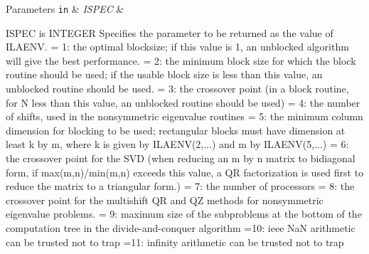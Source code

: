 \begin{DoxyParams}[1]{Parameters}
\mbox{\tt in}  & {\em I\+S\+P\+E\+C} & \begin{DoxyVerb}          ISPEC is INTEGER
          Specifies the parameter to be returned as the value of
          ILAENV.
          = 1: the optimal blocksize; if this value is 1, an unblocked
               algorithm will give the best performance.
          = 2: the minimum block size for which the block routine
               should be used; if the usable block size is less than
               this value, an unblocked routine should be used.
          = 3: the crossover point (in a block routine, for N less
               than this value, an unblocked routine should be used)
          = 4: the number of shifts, used in the nonsymmetric
               eigenvalue routines
          = 5: the minimum column dimension for blocking to be used;
               rectangular blocks must have dimension at least k by m,
               where k is given by ILAENV(2,...) and m by ILAENV(5,...)
          = 6: the crossover point for the SVD (when reducing an m by n
               matrix to bidiagonal form, if max(m,n)/min(m,n) exceeds
               this value, a QR factorization is used first to reduce
               the matrix to a triangular form.)
          = 7: the number of processors
          = 8: the crossover point for the multishift QR and QZ methods
               for nonsymmetric eigenvalue problems.
          = 9: maximum size of the subproblems at the bottom of the
               computation tree in the divide-and-conquer algorithm
          =10: ieee NaN arithmetic can be trusted not to trap
          =11: infinity arithmetic can be trusted not to trap


\end{DoxyVerb}
\end{DoxyParams}
